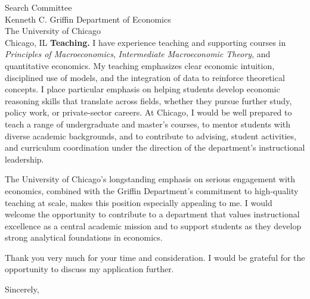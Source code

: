 \documentclass[11pt,letterpaper]{letter}
\begin{document}
\begin{letter}{Search Committee \\
Kenneth C. Griffin Department of Economics \\
The University of Chicago \\
Chicago, IL}
\textbf{Teaching.} I have experience teaching and supporting courses in \textit{Principles of Macroeconomics}, \textit{Intermediate Macroeconomic Theory}, and quantitative economics. My teaching emphasizes clear economic intuition, disciplined use of models, and the integration of data to reinforce theoretical concepts. I place particular emphasis on helping students develop economic reasoning skills that translate across fields, whether they pursue further study, policy work, or private-sector careers. At Chicago, I would be well prepared to teach a range of undergraduate and master’s courses, to mentor students with diverse academic backgrounds, and to contribute to advising, student activities, and curriculum coordination under the direction of the department’s instructional leadership.

The University of Chicago’s longstanding emphasis on serious engagement with economics, combined with the Griffin Department’s commitment to high-quality teaching at scale, makes this position especially appealing to me. I would welcome the opportunity to contribute to a department that values instructional excellence as a central academic mission and to support students as they develop strong analytical foundations in economics.

Thank you very much for your time and consideration. I would be grateful for the opportunity to discuss my application further.

\closing{Sincerely,}

\end{letter}
\end{document}

